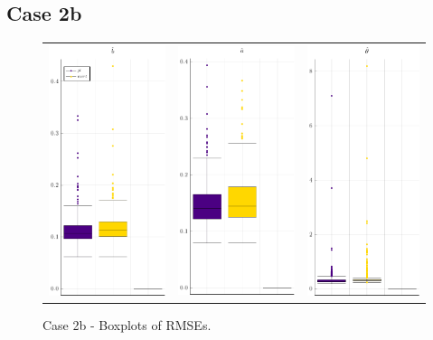 \subsection{Case 2b}
\begin{figure}[ht]
	
	\centering
	\begin{tabular}[b]{c c c}
		\includegraphics[width=.3\textwidth]{Figures/2b/RMSE_b.pdf} & \includegraphics[width=.3\textwidth]{Figures/2b/RMSE_a.pdf} & \includegraphics[width=.3\textwidth]{Figures/2b/RMSE_t.pdf}
	\end{tabular}
\caption{Case 2b - Boxplots of RMSEs.}
	\label{fig:bpRMSE2b}
\end{figure}
